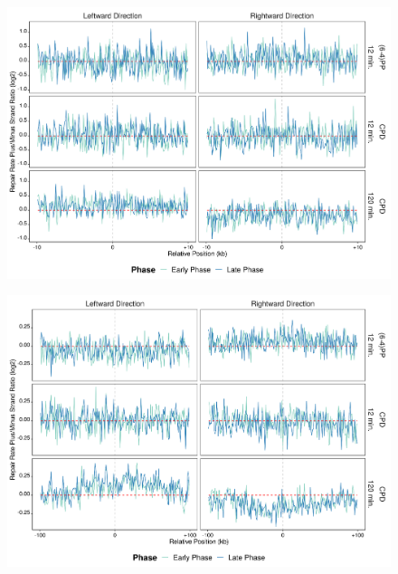 \begin{figure}[H]
\begin{center}
\includegraphics[width=\textwidth]{Chapters/7_appendix/figures/supfig75}
\caption[]{}
\label{supfig:}
\end{center}
\end{figure}

\begin{figure}[H]
\begin{center}
\includegraphics[width=\textwidth]{Chapters/7_appendix/figures/supfig76}
\caption[]{}
\label{supfig:}
\end{center}
\end{figure}

